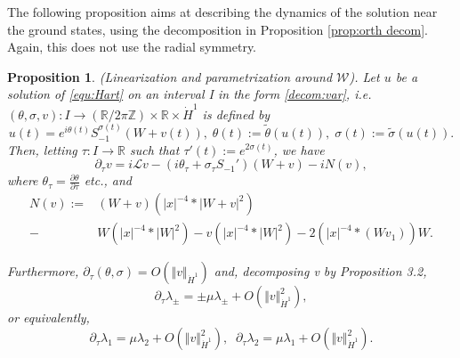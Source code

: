 \documentclass[reqno, 11pt]{amsart}
\numberwithin{equation}{section}
\newcommand{\Z}{{\mathbb{Z}}}
\newcommand{\R}{\mathbb{R}}
\theoremstyle{plain}
\newtheorem{proposition}[theorem]{Proposition}
\theoremstyle{definition}
\numberwithin{equation}{section}
\numberwithin{theorem}{section}
\numberwithin{equation}{section}
\numberwithin{equation}{section}
\numberwithin{theorem}{section}
\begin{document}
	The following proposition aims at describing the dynamics of the solution near the ground states, using the decomposition in Proposition \ref{prop:orth decom}. Again, this does not use the radial symmetry.
	\begin{proposition}(Linearization and parametrization around $\mathcal{W}$)\label{prop:orth decom:u}. Let $u$ be a solution of \eqref{equ:Hart} on an interval I in the form \eqref{decom:var}, i.e. $(\theta,\sigma,v):I\rightarrow (\R/2\pi\Z)\times \R \times \dot H^1$ is defined by 
		\begin{equation}\label{decom:u}
		u(t)=e^{i\theta(t)}S_{-1}^{\sigma(t)}\left(W+v(t) \right),\; \theta(t):=\widetilde{\theta}(u(t)),\;\sigma(t):=\widetilde{\sigma}(u(t)).
		\end{equation}
		Then, letting $\tau:I\rightarrow\R$ such that $\tau'(t):=e^{2\sigma(t)}$, we have 
		\begin{equation} \label{equ:linez}
		\partial_{\tau}v=i\mathcal{L}v-\left( i\theta_{\tau}+\sigma_{\tau}S_{-1}'\right)(W+v)-iN(v),
		\end{equation}
		where $\theta_{\tau}=\frac{\partial\theta}{\partial\tau}$ etc., and 
		\begin{equation*}
		\begin{aligned}
		N(v):=&(W+v)\left( |x|^{-4}*|W+v|^2 \right)\\-&W\left( |x|^{-4}*|W|^2 \right)-v\left( |x|^{-4}*|W|^2 \right)-2\left( |x|^{-4}*(Wv_1) \right)W.
		\end{aligned}
		\end{equation*}
		
		Furthermore, $\partial_{\tau}(\theta,\sigma)=O(\Vert v\Vert_{\dot H^1})$ and, decomposing v by Proposition 3.2, 
		\begin{equation}\label{est:dyn lam+}
		\partial_{\tau}\lambda_\pm=\pm\mu\lambda_\pm+O(\Vert v\Vert_{\dot H^1}^2),
		\end{equation}
		or equivalently,
		\begin{equation}\label{est:dyn lam1}
		\partial_{\tau}\lambda_1=\mu\lambda_{2}+O(\Vert v\Vert_{\dot H^1}^2),\;\;	\partial_{\tau}\lambda_2=\mu\lambda_{1}+O(\Vert v\Vert_{\dot H^1}^2).
		\end{equation}
	\end{proposition}
	
\end{document}
